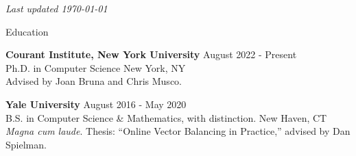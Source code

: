 \documentclass{resume} %
\begin{document}
\centerline{\textit{Last updated \today}}


\begin{rSection}{Education}

{\textbf{Courant Institute, New York University}} \hfill {August 2022 - Present}
\\ 
Ph.D. in Computer Science \hfill {New York, NY}
\\
Advised by Joan Bruna and Chris Musco.

{\textbf{Yale University}} \hfill {August 2016 - May 2020}
\\ 
B.S. in Computer Science \& Mathematics, with distinction. \hfill {New Haven, CT}
\\
\textit{Magna cum laude}. Thesis: ``Online Vector Balancing in Practice,'' advised by Dan Spielman.

\end{rSection} 



 


\end{document}
